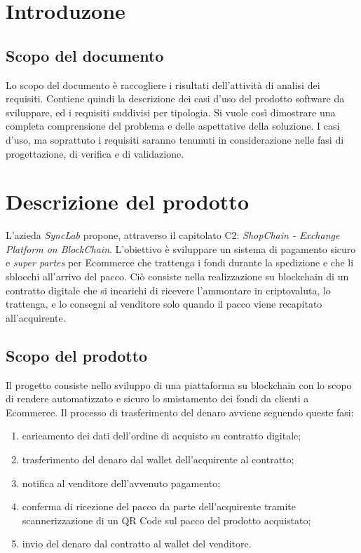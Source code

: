 \documentclass[a4paper, 12pt]{article}
\begin{document}
\makefrontpage

\makeversioni

\section{Introduzone}
\subsection{Scopo del documento}
Lo scopo del documento è raccogliere i risultati dell'attività di analisi dei requisiti. Contiene quindi la descrizione dei casi d'uso del prodotto software da sviluppare, ed i requisiti suddivisi per tipologia. Si vuole così dimostrare una completa comprensione del problema e delle aspettative della soluzione. I casi d'uso, ma soprattuto i requisiti saranno tenunuti in considerazione nelle fasi di progettazione, di verifica e di validazione.

\section{Descrizione del prodotto}
L'azieda \textit{SyncLab} propone, attraverso il capitolato C2: \textit{ShopChain - Exchange Platform on
BlockChain}. L'obiettivo è sviluppare un sistema di pagamento sicuro e \textit{super partes} per Ecommerce che trattenga i fondi durante la spedizione e che li sblocchi all'arrivo del pacco. Ciò consiste nella realizzazione su blockchain di un contratto digitale che si incarichi di ricevere l’ammontare in criptovaluta, lo trattenga, e lo consegni al venditore solo quando il pacco viene recapitato all’acquirente.
\subsection{Scopo del prodotto}
Il progetto consiste nello sviluppo di una piattaforma su blockchain con lo scopo di rendere automatizzato e sicuro lo smistamento dei fondi da clienti a Ecommerce. Il processo di trasferimento del denaro avviene seguendo queste fasi:
\begin{enumerate}
\item caricamento dei dati dell'ordine di acquisto su contratto digitale;
\item trasferimento del denaro dal wallet dell'acquirente al contratto;
\item notifica al venditore dell'avvenuto pagamento;
\item conferma di ricezione del pacco da parte dell'acquirente tramite scannerizzazione di un QR Code sul pacco del prodotto acquistato;
\item invio del denaro dal contratto al wallet del venditore.
\end{enumerate}
\end{document}

